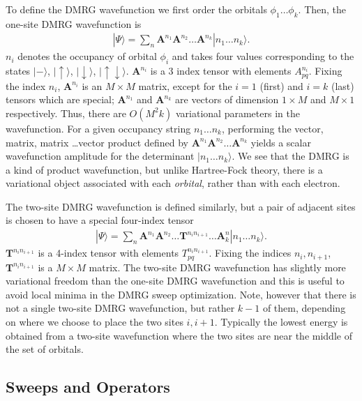 \documentclass[letterpaper,12pt,aps, pra]{revtex4-1}
\begin{document}
To define the DMRG wavefunction we first order the orbitals 
$\phi_1 \ldots \phi_k$. Then, the one-site DMRG wavefunction is
\begin{align}
|\Psi\rangle = \sum_{n} \mathbf{A}^{n_1} \mathbf{A}^{n_2} \ldots \mathbf{A}^{n_k} |n_1 \ldots n_k\rangle \label{eq:one_site}.
\end{align}
$n_i$ denotes the occupancy of orbital $\phi_i$ and takes four values corresponding to
 the states $|-\rangle$, $|\uparrow\rangle$, $|\downarrow\rangle$, $|\uparrow\downarrow\rangle$.
$\mathbf{A}^{n_i}$ is a 3 index tensor with elements $A^{n_i}_{pq}$. Fixing the index $n_i$, $\mathbf{A}^{n_i}$  
is  an $M \times M$ matrix, except for the $i=1$ (first) and $i=k$ (last) tensors which are special;
 $\mathbf{A}^{n_1}$ and $\mathbf{A}^{n_k}$ are vectors of dimension $1\times M$ and $M\times 1$ respectively.
Thus, there are  $O(M^2k)$  variational parameters in the wavefunction.
For a  given occupancy string $n_1 \ldots n_k$, performing the vector, matrix, matrix \ldots vector product
defined by $\mathbf{A}^{n_1} \mathbf{A}^{n_2} \ldots \mathbf{A}^{n_k}$ yields
a scalar wavefunction amplitude for the determinant $|n_1 \ldots n_k\rangle$. We see that the DMRG
is a kind of product wavefunction, but unlike Hartree-Fock theory, there is a variational object
associated with each {\it orbital}, rather than with each electron.


The two-site DMRG wavefunction is defined similarly,
but a pair of adjacent sites is chosen to have a special four-index tensor
\begin{align}
|\Psi\rangle = \sum_{n} \mathbf{A}^{n_1} \mathbf{A}^{n_2}\ldots \mathbf{T}^{n_i n_{i+1}} \ldots \mathbf{A}^{n}_k |n_1 \ldots n_k\rangle \label{eq:two_site}.
\end{align}
 $\mathbf{T}^{n_i n_{i+1}}$ is a 4-index tensor with elements $T^{n_i n_{i+1}}_{pq}$. Fixing the indices $n_i, n_{i+1}$, 
 $\mathbf{T}^{n_i n_{i+1}}$ is a $M \times M$ matrix.
The two-site DMRG wavefunction has slightly more variational freedom than the one-site DMRG wavefunction 
and this  is useful to avoid local minima in the DMRG sweep optimization. Note, however
that there is not a single two-site DMRG wavefunction, but rather $k-1$ of them, depending
on where we choose to place the two sites $i, i+1$. Typically
the lowest energy is obtained from a two-site wavefunction where the two sites are near the middle of the set of orbitals. 

\subsection{Sweeps and Operators} 
\end{document}

